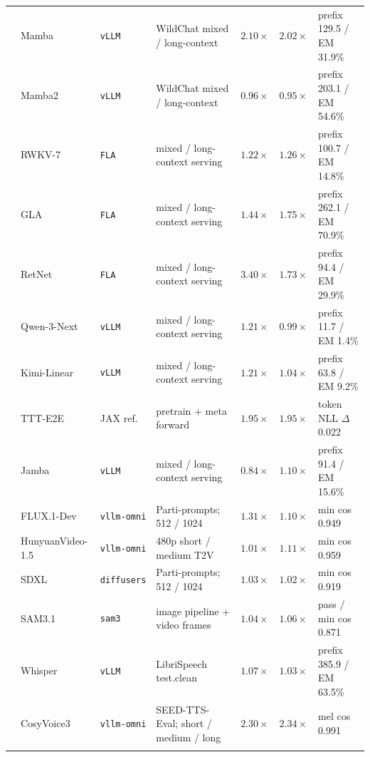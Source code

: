 \begin{table}[H]
{\begin{tabular}{@{}ll>{\raggedright\arraybackslash}p{1.55cm}>{\raggedright\arraybackslash}p{2.6cm}cc>{\raggedright\arraybackslash}p{2.35cm}@{}}
       & Mamba & \texttt{vLLM} & WildChat mixed / long-context & $2.10\times$ & $2.02\times$ & prefix 129.5 / EM 31.9\% \\
       & Mamba2 & \texttt{vLLM} & WildChat mixed / long-context & $0.96\times$ & $0.95\times$ & prefix 203.1 / EM 54.6\% \\
       & RWKV-7 & \texttt{FLA} & mixed / long-context serving & $1.22\times$ & $1.26\times$ & prefix 100.7 / EM 14.8\% \\
       & GLA & \texttt{FLA} & mixed / long-context serving & $1.44\times$ & $1.75\times$ & prefix 262.1 / EM 70.9\% \\
       & RetNet & \texttt{FLA} & mixed / long-context serving & $3.40\times$ & $1.73\times$ & prefix 94.4 / EM 29.9\% \\
       & Qwen-3-Next & \texttt{vLLM} & mixed / long-context serving & $1.21\times$ & $0.99\times$ & prefix 11.7 / EM 1.4\% \\
       & Kimi-Linear & \texttt{vLLM} & mixed / long-context serving & $1.21\times$ & $1.04\times$ & prefix 63.8 / EM 9.2\% \\
       & TTT-E2E & JAX ref. & pretrain + meta forward & $1.95\times$ & $1.95\times$ & token NLL $\Delta$ 0.022 \\
       & Jamba & \texttt{vLLM} & mixed / long-context serving & $0.84\times$ & $1.10\times$ & prefix 91.4 / EM 15.6\% \\
      \midrule
       & FLUX.1-Dev & \texttt{vllm-omni} & Parti-prompts; 512 / 1024 & $1.31\times$ & $1.10\times$ & min cos 0.949 \\
       & HunyuanVideo-1.5 & \texttt{vllm-omni} & 480p short / medium T2V & $1.01\times$ & $1.11\times$ & min cos 0.959 \\
       & SDXL & \texttt{diffusers} & Parti-prompts; 512 / 1024 & $1.03\times$ & $1.02\times$ & min cos 0.919 \\
       & SAM3.1 & \texttt{sam3} & image pipeline + video frames & $1.04\times$ & $1.06\times$ & pass / min cos 0.871 \\
       & Whisper & \texttt{vLLM} & LibriSpeech test.clean & $1.07\times$ & $1.03\times$ & prefix 385.9 / EM 63.5\% \\
       & CosyVoice3 & \texttt{vllm-omni} & SEED-TTS-Eval; short / medium / long & $2.30\times$ & $2.34\times$ & mel cos 0.991 \\
      \midrule

\end{tabular}}
\end{table}
